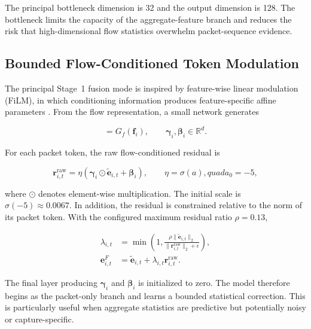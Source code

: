 \documentclass[11pt,fleqn]{report}
\begin{document}
The principal bottleneck dimension is 32 and the output dimension is 128. The
bottleneck limits the capacity of the aggregate-feature branch and reduces the
risk that high-dimensional flow statistics overwhelm packet-sequence evidence.

\subsection{Bounded Flow-Conditioned Token Modulation}
\label{subsubsec:token_film}

The principal Stage~1 fusion mode is inspired by feature-wise linear modulation
(FiLM), in which conditioning information produces feature-specific affine
parameters \cite{Perez2018FiLM}. From the flow representation, a small network
generates

\begin{equation}
    [\boldsymbol{\gamma}_i;\boldsymbol{\beta}_i]
    =G_f(\mathbf{f}_i),
    \qquad
    \boldsymbol{\gamma}_i,\boldsymbol{\beta}_i\in\mathbb{R}^{d}.
    \label{eq:film_parameters}
\end{equation}

For each packet token, the raw flow-conditioned residual is

\begin{equation}
    \mathbf{r}^{\mathrm{raw}}_{i,t}
    =\eta
    \left(
        \boldsymbol{\gamma}_i\odot\widetilde{\mathbf{e}}_{i,t}
        +\boldsymbol{\beta}_i
    \right),
    \qquad
    \eta=\sigma(a),quad a_{0}=-5,
    \label{eq:film_raw_residual}
\end{equation}

where $\odot$ denotes element-wise multiplication. The initial scale is
$\sigma(-5)\approx0.0067$. In addition, the residual is constrained relative
to the norm of its packet token. With the configured maximum residual ratio
$\rho=0.13$,

\begin{align}
    \lambda_{i,t}
    &=\min\left(
        1,
        \frac{\rho\|\widetilde{\mathbf{e}}_{i,t}\|_2}
             {\|\mathbf{r}^{\mathrm{raw}}_{i,t}\|_2+\epsilon}
      \right),\\
    \mathbf{e}^{F}_{i,t}
    &=\widetilde{\mathbf{e}}_{i,t}
      +\lambda_{i,t}\mathbf{r}^{\mathrm{raw}}_{i,t}.
    \label{eq:bounded_token_film}
\end{align}

The final layer producing $\boldsymbol{\gamma}_i$ and
$\boldsymbol{\beta}_i$ is initialized to zero. The model therefore begins as
the packet-only branch and learns a bounded statistical correction. This is
particularly useful when aggregate statistics are predictive but potentially
noisy or capture-specific.
\end{document}
